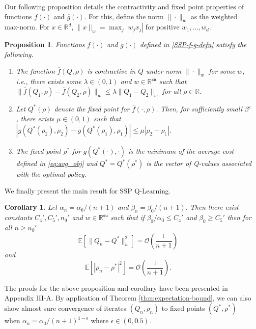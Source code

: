 \documentclass[letterpaper, 10 pt, conference]{ieeeconf}  %
\theoremstyle{definition}
\theoremstyle{plain}
\newtheorem{proposition}{Proposition}
\newtheorem{corollary}{Corollary}
\newcommand{\barf}{\overline{f}}
\newcommand{\barg}{\overline{g}}
\newcommand{\Qstar}{Q^*}
\newcommand{\rhostar}{\rho^*}
\newcommand{\sfrak}{\mathfrak{s}}
\newcommand{\ufrak}{\mathfrak{u}}
\newcommand{\RR}{\mathbb{R}}
\newcommand{\EE}{\mathbb{E}}
\begin{document}
Our following proposition details the contractivity and fixed point properties of functions $\barf(\cdot)$ and $\barg(\cdot)$. For this, define the norm $\|\cdot\|_w$ as the weighted max-norm. For $x\in\RR^d$, $\|x\|_w=\max_j|w_jx_j|$ for positive $w_1,\ldots,w_d$.

\begin{proposition}\label{prop:SSP}
Functions $f(\cdot)$ and $\barg(\cdot)$ defined in \eqref{SSP-f-g-defn} satisfy the following.
\begin{enumerate}[label=(\alph*)]
    \item The function $\barf(Q,\rho)$ is contractive in $Q$ under norm $\|\cdot\|_w$ for some $w$, i.e., there exists some $\lambda\in(0,1)$ and $w\in\RR^{\sfrak\ufrak}$ such that $\|\barf(Q_1,\rho)-\barf(Q_2,\rho)\|_w\leq \lambda\|Q_1-Q_2\|_w$ for all $\rho\in\RR$. 
    \item Let $\Qstar(\rho)$ denote the fixed point for $\barf(\cdot,\rho)$. Then, for sufficiently small $\beta'$, there exists $\mu\in(0,1)$ such that $|\barg(\Qstar(\rho_2),\rho_2)-\barg(\Qstar(\rho_1),\rho_1)|\leq \mu|\rho_2-\rho_1|$.
    \item The fixed point $\rhostar$ for $\barg(\Qstar(\cdot),\cdot)$ is the minimum of the average cost defined in \eqref{eq:avg_obj} and $\Qstar=\Qstar(\rhostar)$ is the vector of Q-values associated with the optimal policy.
\end{enumerate}
\end{proposition}

We finally present the main result for SSP Q-Learning. 
\begin{corollary}\label{coro:SSP}
    Let $\alpha_n=\alpha_0/(n+1)$ and $\beta_n=\beta_0/(n+1)$. Then there exist constants $C_4', C_5', n_0'$ and $w\in\RR^{\sfrak\ufrak}$ such that if $\beta_0/\alpha_0\leq C_4'$ and $\beta_0\geq C_5'$ then for all $n\geq n_0'$
    $$\EE[\|Q_n-\Qstar\|^2_w]= \mathcal{O}\left(\frac{1}{n+1}\right)$$ and $$\EE[|\rho_n-\rho^*|^2]=\mathcal{O}\left(\frac{1}{n+1}\right).$$
\end{corollary}
The proofs for the above proposition and corollary have been presented in Appendix III-A. By application of Theorem \ref{thm:expectation-bound}, we can also show almost sure convergence of iterates $(Q_n,\rho_n)$ to fixed points $(\Qstar,\rhostar)$ when $\alpha_n=\alpha_0/(n+1)^{1-\epsilon}$ where $\epsilon\in(0,0.5)$.
\end{document}
